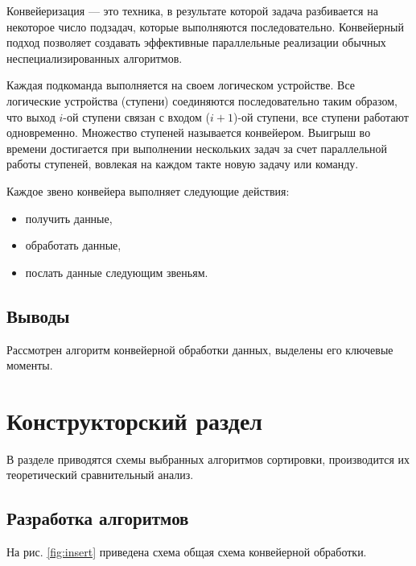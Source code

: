 \documentclass[a4paper,12pt]{article}
\begin{document}
Конвейеризация --- это техника, в результате которой  задача
разбивается  на некоторое число подзадач,
которые  выполняются последовательно.
Конвейерный подход позволяет создавать эффективные параллельные реализации обычных 
неспециализированных алгоритмов. ~\cite{iu7}

Каждая  подкоманда   выполняется на своем логическом  устройстве.
Все     логические    устройства   (ступени)  соединяются последовательно
таким образом, что выход  $i$-ой   ступени   связан   с   
входом   ($i+1$)-ой   ступени,  все ступени  работают  одновременно.  
Множество  ступеней называется    конвейером.    
Выигрыш     во    времени достигается при  выполнении  нескольких задач  
за  счет параллельной   работы   ступеней,  
вовлекая  на  каждом такте новую задачу или команду.  ~\cite{korn}

Каждое звено конвейера выполняет следующие действия:

\begin{itemize}
	\item     получить данные,
	
	\item     обработать данные,
	
	\item      послать данные следующим звеньям.
\end{itemize}

\subsection*{Выводы}

Рассмотрен алгоритм конвейерной обработки данных, выделены его ключевые моменты.

\newpage

\section{Конструкторский раздел}

В разделе приводятся схемы выбранных алгоритмов сортировки,
производится их теоретический сравнительный анализ.

\subsection{Разработка алгоритмов}

На рис. \ref{fig:insert} приведена схема 
общая схема конвейерной обработки.
\end{document}
